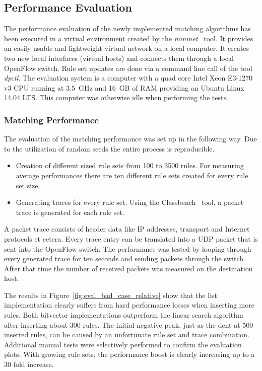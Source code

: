 \documentclass[conference]{IEEEtran}
\begin{document}
\subsection{Performance Evaluation}

The performance evaluation of the newly implemented matching algorithms has 
been executed in a virtual environment created by the \textit{mininet}~\cite{mininet} tool.
It provides an easily usable and lightweight virtual network on a local computer.
It creates two new local interfaces (virtual hosts) and connects them through 
a local OpenFlow switch.
Rule set updates are done via a command line call of the tool \textit{dpctl}.
The evaluation system is a computer with a quad core Intel Xeon E3-1270 v3 CPU 
running at 3.5\ GHz and 16\ GB of RAM providing an Ubuntu Linux 14.04 LTS.
This computer was otherwise idle when performing the tests.

\subsubsection{Matching Performance}
The evaluation of the matching performance was set up in the following way.
Due to the utilization of random seeds the entire process is reproducible.
\begin{itemize}
    \item Creation of different sized rule sets from 100 to 3500 rules.
        For measuring average performances there are ten different rule sets created for every rule set size.
    \item Generating traces for every rule set.
        Using the Classbench~\cite{classbench_website} tool, a packet trace is generated for each rule set.
\end{itemize}

A packet trace consists of header data like IP addresses, transport and Internet protocols et cetera.
Every trace entry can be translated into a UDP packet that is sent into the OpenFlow switch.
The performance was tested by looping through every generated trace for ten seconds and sending packets through the switch.
After that time the number of received packets was measured on the destination host.

The results in Figure~\ref{fig:eval_bad_case_relative} show that the list implementation
clearly suffers from hard performance losses when inserting more rules.
Both bitvector implementations outperform the linear search algorithm after inserting about 300 rules.
The initial negative peak, just as the dent at 500 inserted rules, can be caused by an unfortunate rule set and trace combination.
Additional manual tests were selectively performed to confirm the evaluation plots.
With growing rule sets, the performance boost is clearly increasing up to a 30 fold increase.
\end{document}
